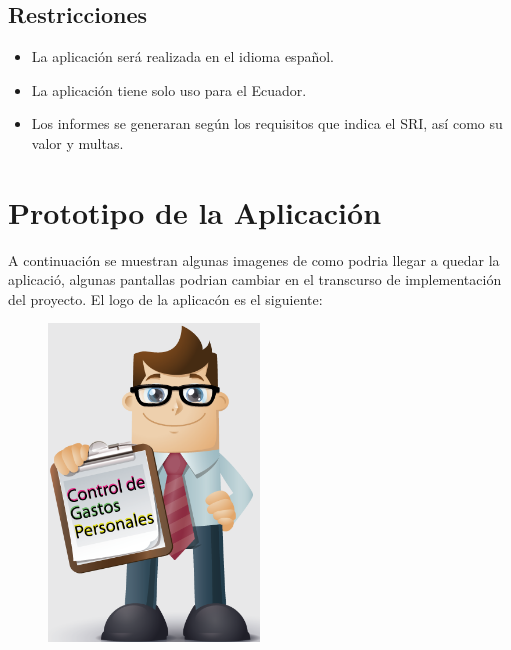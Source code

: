 \documentclass[a4paper,11pt]{article}
\begin{document}
  \newpage
    \subsection{ Restricciones}
\begin{itemize}
\item La aplicación será realizada en el idioma español.
\item La aplicación tiene solo uso para el Ecuador.
\item Los informes se generaran según los requisitos que indica el SRI, así como su valor y multas.
\end{itemize}

\section{ Prototipo de la Aplicación}
A continuación se muestran algunas imagenes de como podria llegar a quedar la aplicació, algunas pantallas podrian cambiar en el transcurso de implementación del proyecto.
El logo de la aplicacón es el siguiente:

\begin{figure} [h]
\begin {center}
\includegraphics[width=0.5\textwidth]{apli.png}
\end {center}
\end{figure}
\end{document}
